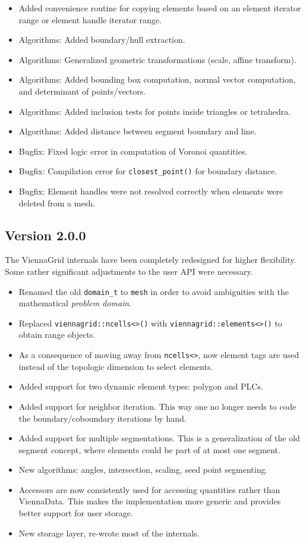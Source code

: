 \begin{itemize}
 \item Added convenience routine for copying elements based on an element iterator range or element handle iterator range.
 \item Algorithms: Added boundary/hull extraction.
 \item Algorithms: Generalized geometric transformations (scale, affine transform).
 \item Algorithms: Added bounding box computation, normal vector computation, and determinant of points/vectors.
 \item Algorithms: Added inclusion tests for points inside triangles or tetrahedra.
 \item Algorithms: Added distance between segment boundary and line.
 \item Bugfix: Fixed logic error in computation of Voronoi quantities.
 \item Bugfix: Compilation error for \lstinline|closest_point()| for boundary distance.
 \item Bugfix: Element handles were not resolved correctly when elements were deleted from a mesh.
\end{itemize}

\subsection*{Version 2.0.0}
The ViennaGrid internals have been completely redesigned for higher flexibility.
Some rather significant adjustments to the user API were necessary.
\begin{itemize}
 \item Renamed the old \lstinline|domain_t| to \lstinline|mesh| in order to avoid ambiguities with the mathematical \emph{problem domain}.
 \item Replaced \lstinline|viennagrid::ncells<>()| with \lstinline|viennagrid::elements<>()| to obtain range objects.
 \item As a consequence of moving away from \lstinline|ncells<>|, now element tags are used instead of the topologic dimension to select elements.
 \item Added support for two dynamic element types: polygon and PLCs.
 \item Added support for neighbor iteration. This way one no longer needs to code the boundary/coboundary iterations by hand.
 \item Added support for multiple segmentations. This is a generalization of the old segment concept, where elements could be part of at most one segment.
 \item New algorithms: angles, intersection, scaling, seed point segmenting.
 \item Accessors are now consistently used for accessing quantities rather than ViennaData. This makes the implementation more generic and provides better support for user storage.
 \item New storage layer, re-wrote most of the internals.
\end{itemize}


